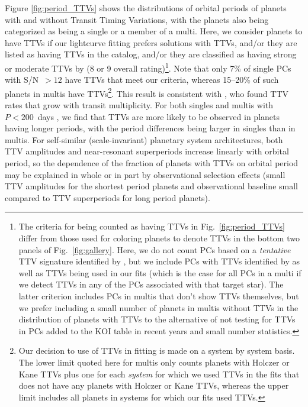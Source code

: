 \documentclass{aastex62}
\begin{document}
Figure \ref{fig:period_TTVs} shows the distributions of orbital periods of planets with and without Transit Timing Variations, with the planets also being categorized as being a single or a member of a multi.  Here, we consider planets to have TTVs if our lightcurve fitting prefers solutions with TTVs, and/or they are listed as having TTVs in the \cite{Holczer:2016} catalog, and/or they are classified as having strong or moderate TTVs by \cite{Kane:2019} (8 or 9 overall rating)\footnote{The criteria for being counted as having TTVs in Fig.~\ref{fig:period_TTVs} differ from those used for coloring planets to denote TTVs in the bottom two panels of Fig.~\ref{fig:gallery}. Here, we do not count PCs based on a \emph{tentative} TTV signature identified by \cite{Kane:2019}, but we include PCs with TTVs identified by \cite{Holczer:2016} as well as TTVs being used in our fits (which is the case for all PCs in a multi if we detect TTVs in any of the PCs associated with that target star). The latter criterion includes PCs in multis that don't show TTVs themselves, but we prefer including a small number of planets in multis without TTVs in the distribution of planets with TTVs to the alternative of not testing for TTVs in PCs added to the KOI table in recent years and small number statistics.}.  Note that only 7\% of single PCs with S/N~$> 12$ have TTVs that meet our criteria, whereas 15--20\% of such planets in multis have TTVs\footnote{ Our decision to use of TTVs in fitting is made on a system by system basis. The lower limit quoted here for multis only counts planets with Holczer or Kane TTVs plus one for each \emph{system} for which we used TTVs in the fits that does not have any planets with Holczer or Kane TTVs, whereas the upper limit includes all planets in systems for which our fits used TTVs.}. This result is consistent with \cite{2014Xie}, who found TTV rates that grow with transit multiplicity. For both singles and multis with $P < 200$~days%
, we find that TTVs are more likely to be observed in planets having longer periods, with the period differences being larger in singles than in multis.  For self-similar (scale-invariant) planetary system architectures, both TTV amplitudes and near-resonant superperiods increase linearly with orbital period, so the dependence of the fraction of planets with TTVs on orbital period may be explained in whole or in part by observational selection effects (small TTV amplitudes for the shortest period planets and observational baseline small compared to TTV superperiods for long period planets).
\end{document}
